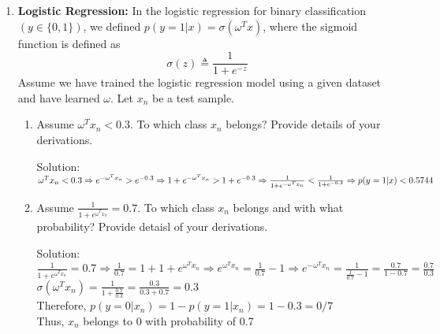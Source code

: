 \documentclass[12pt]{article}
\newcommand{\solu}{{\color{blue} Solution:}}
\begin{document}
\begin{enumerate}
        \item \textbf{Logistic Regression:} In the logistic regression for binary classification $(y \in \{0,1\})$, we defined $p(y = 1 | x) = \sigma(\omega^Tx)$, where the sigmoid function is defined as
        $$\sigma(z) \triangleq \frac{1}{1 + e^{-z}}$$
        Assume we have trained the logistic regression model using a given dataset and have learned $\omega$. Let $x_n$ be a test sample.
        \begin{enumerate}
            \item Assume $\omega^T x_n < 0.3$. To which class $x_n$ belongs? Provide details of your derivations.
            
            \solu\\
            $\omega^T x_n < 0.3 \Rightarrow e^{-\omega^T x_n} > e^{-0.3}\\
            \Rightarrow 1 + e^{-\omega^T x_n} > 1 + e^{-0.3}\\
            \Rightarrow \frac{1}{1 + e^{-\omega^T x_n}} < \frac{1}{1 + e^{-0.3}}\\
            \Rightarrow p(y = 1 | x) < 0.5744$

            \item Assume $\frac{1}{1+e^{\omega^T x_n}} = 0.7.$ To which class $x_n$ belongs and with what probability? Provide detaisl of your derivations.
            
            \solu \\
            $\frac{1}{1+e^{\omega^T x_n}} = 0.7 \Rightarrow \frac{1}{0.7} = 1 + 1+e^{\omega^T x_n} \Rightarrow e^{\omega^T x_n} = \frac{1}{0.7} -1 \Rightarrow e^{-\omega^T x_n} = \frac{1}{\frac{1}{0.7} -1} = \frac{0.7}{1-0.7} = \frac{0.7}{0.3} $\\
            $\sigma(\omega^Tx_n) = \frac{1}{1+\frac{0.7}{0.3}} = \frac{0.3}{0.3+0.7} = 0.3$\\
            Therefore, $p(y = 0 | x_n) = 1 - p(y = 1 | x_n) = 1-0.3 = 0/7$ \\
            Thus, $x_n$ belongs to 0 with probability of 0.7
        \end{enumerate}
    \end{enumerate}
\end{document}
